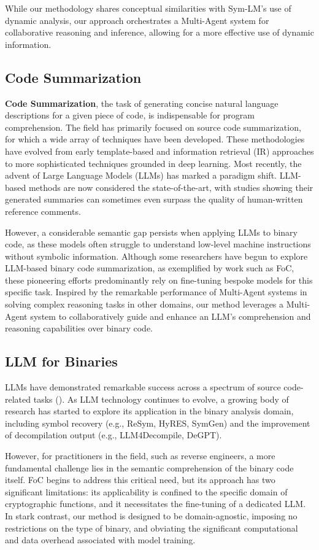 \documentclass[acmsmall,screen,review,anonymous]{acmart} %
\begin{document}
While our methodology shares conceptual similarities with Sym-LM's use of dynamic analysis, our approach orchestrates a Multi-Agent system for collaborative reasoning and inference, allowing for a more effective use of dynamic information.

\subsection{Code Summarization}
\textbf{Code Summarization}, the task of generating concise natural language descriptions for a given piece of code, is indispensable for program comprehension. The field has primarily focused on source code summarization, for which a wide array of techniques have been developed. These methodologies have evolved from early template-based and information retrieval (IR) approaches to more sophisticated techniques grounded in deep learning. Most recently, the advent of Large Language Models (LLMs) has marked a paradigm shift. LLM-based methods are now considered the state-of-the-art, with studies showing their generated summaries can sometimes even surpass the quality of human-written reference comments.

However, a considerable semantic gap persists when applying LLMs to binary code, as these models often struggle to understand low-level machine instructions without symbolic information. Although some researchers have begun to explore LLM-based binary code summarization, as exemplified by work such as FoC, these pioneering efforts predominantly rely on fine-tuning bespoke models for this specific task. Inspired by the remarkable performance of Multi-Agent systems in solving complex reasoning tasks in other domains, our method leverages a Multi-Agent system to collaboratively guide and enhance an LLM's comprehension and reasoning capabilities over binary code.


\subsection{LLM for Binaries}
LLMs have demonstrated remarkable success across a spectrum of source code-related tasks (). As LLM technology continues to evolve, a growing body of research has started to explore its application in the binary analysis domain, including symbol recovery (e.g., ReSym, HyRES, SymGen) and the improvement of decompilation output (e.g., LLM4Decompile, DeGPT).

However, for practitioners in the field, such as reverse engineers, a more fundamental challenge lies in the semantic comprehension of the binary code itself. FoC begins to address this critical need, but its approach has two significant limitations: its applicability is confined to the specific domain of cryptographic functions, and it necessitates the fine-tuning of a dedicated LLM. In stark contrast, our method is designed to be domain-agnostic, imposing no restrictions on the type of binary, and obviating the significant computational and data overhead associated with model training.
\end{document}
